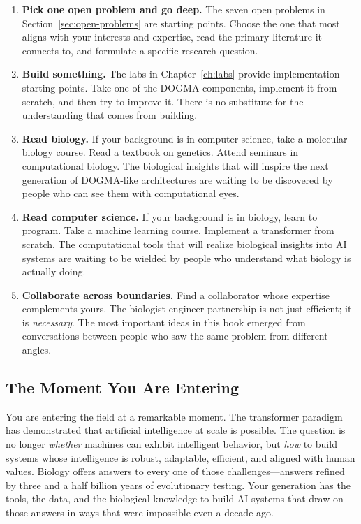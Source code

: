 \begin{enumerate}[leftmargin=1.8em]
  \item \textbf{Pick one open problem and go deep.} The seven open problems in Section~\ref{sec:open-problems} are starting points. Choose the one that most aligns with your interests and expertise, read the primary literature it connects to, and formulate a specific research question.

  \item \textbf{Build something.} The labs in Chapter~\ref{ch:labs} provide implementation starting points. Take one of the DOGMA components, implement it from scratch, and then try to improve it. There is no substitute for the understanding that comes from building.

  \item \textbf{Read biology.} If your background is in computer science, take a molecular biology course. Read a textbook on genetics. Attend seminars in computational biology. The biological insights that will inspire the next generation of DOGMA-like architectures are waiting to be discovered by people who can see them with computational eyes.

  \item \textbf{Read computer science.} If your background is in biology, learn to program. Take a machine learning course. Implement a transformer from scratch. The computational tools that will realize biological insights into AI systems are waiting to be wielded by people who understand what biology is actually doing.

  \item \textbf{Collaborate across boundaries.} Find a collaborator whose expertise complements yours. The biologist-engineer partnership is not just efficient; it is \emph{necessary}. The most important ideas in this book emerged from conversations between people who saw the same problem from different angles.
\end{enumerate}

\subsection{The Moment You Are Entering}

You are entering the field at a remarkable moment. The transformer paradigm has demonstrated that artificial intelligence at scale is possible. The question is no longer \emph{whether} machines can exhibit intelligent behavior, but \emph{how} to build systems whose intelligence is robust, adaptable, efficient, and aligned with human values. Biology offers answers to every one of those challenges---answers refined by three and a half billion years of evolutionary testing. Your generation has the tools, the data, and the biological knowledge to build AI systems that draw on those answers in ways that were impossible even a decade ago.

